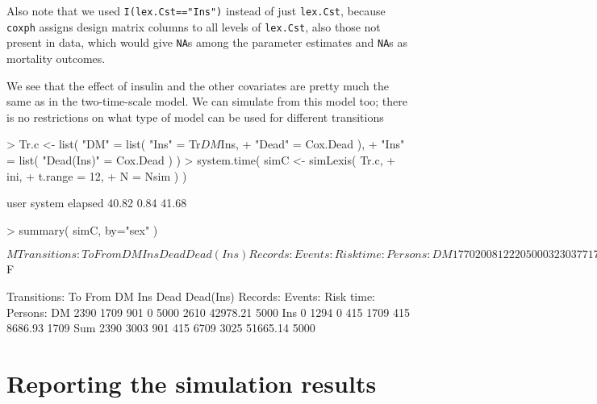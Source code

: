\documentclass[a4paper,twoside,12pt]{report}
\begin{document}
Also note that we used \texttt{I(lex.Cst=="Ins")} instead of just
\texttt{lex.Cst}, because \texttt{coxph} assigns design matrix columns
to all levels of \texttt{lex.Cst}, also those not present in data,
which would give \texttt{NA}s among the parameter estimates and
\texttt{NA}s as mortality outcomes.

We see that the effect of insulin and the other covariates are pretty
much the same as in the two-time-scale model. We can simulate from this
model too; there is no restrictions on what type of model can be used
for different transitions
\begin{Schunk}
\begin{Sinput}
> Tr.c <- list( "DM" = list( "Ins"       = Tr$DM$Ins,
+                            "Dead"      = Cox.Dead  ),
+              "Ins" = list( "Dead(Ins)" = Cox.Dead ) )
> system.time( simC <- simLexis( Tr.c,
+                                 ini,
+                             t.range = 12,
+                                   N = Nsim ) )
\end{Sinput}
\begin{Soutput}
   user  system elapsed 
  40.82    0.84   41.68 
\end{Soutput}
\begin{Sinput}
> summary( simC, by="sex" )
\end{Sinput}
\begin{Soutput}
$M
     
Transitions:
     To
From    DM  Ins Dead Dead(Ins)  Records:  Events: Risk time:  Persons:
  DM  1770 2008 1222         0      5000     3230   37717.04      5000
  Ins    0 1324    0       684      2008      684    9846.12      2008
  Sum 1770 3332 1222       684      7008     3914   47563.16      5000

$F
     
Transitions:
     To
From    DM  Ins Dead Dead(Ins)  Records:  Events: Risk time:  Persons:
  DM  2390 1709  901         0      5000     2610   42978.21      5000
  Ins    0 1294    0       415      1709      415    8686.93      1709
  Sum 2390 3003  901       415      6709     3025   51665.14      5000
\end{Soutput}
\end{Schunk}

\section{Reporting the simulation results}
\end{document}
